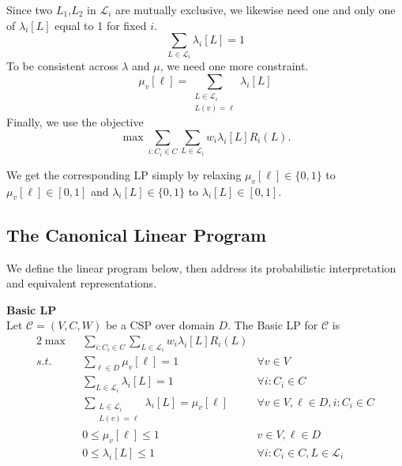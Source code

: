 Since two $L_1$,$L_2$ in $ \mathcal{L}_i$ are mutually exclusive, we likewise need one and only one of $\lambda_i[L]$ equal to 1 for fixed $i$.
\begin{equation*}
\sum_{L \in \mathcal{L}_i} \lambda_i[L] = 1 
\end{equation*}
To be consistent across $\lambda$ and $\mu$, we need one more constraint.
\begin{equation*}
\mu_v[\ell] = \sum_{\substack{ L \in \mathcal{L}_i \\ L(v) = \ell }} \lambda_i[L] 
\end{equation*}
Finally, we use the objective
\begin{equation*}
\max \sum_{i : C_i \in C} \sum_{L \in \mathcal{L}_i}   w_i\lambda_i[L] R_i(L).
\end{equation*}

We get the corresponding LP simply by relaxing $\mu_v[\ell] \in \{0,1\}$ to $\mu_v[\ell] \in [0,1]$ and $\lambda_i[L] \in \{0,1\}$ to $\lambda_i[L] \in [0,1]$.
\subsection{The Canonical Linear Program}

We define the linear program below, then address its probabilistic interpretation and equivalent representations.
\begin{definition}\textbf{Basic LP} \\
Let $\mathcal{C} = (V,C,W)$ be a CSP over domain $D$. The Basic LP for $\mathcal{C}$ is
\begin{alignat}{2}
\max ~&~ \sum_{i : C_i \in C} \sum_{L \in \mathcal{L}_i}   w_i\lambda_i[L] R_i(L) & \\
s.t. ~ & ~ \sum_{\ell \in D} \mu_v[\ell] = 1 & \forall v \in V  \label{eq:canonLPmuSum} \\
     ~ & ~ \sum_{L \in \mathcal{L}_i} \lambda_i[L] = 1  & \forall i : C_i \in C \label{eq:canonLPlambdaSum} \\
     ~ & ~ \sum_{\substack{ L \in \mathcal{L}_i \\ L(v) = \ell }} \lambda_i[L] = \mu_v[\ell]  & \forall v \in V, \ell \in D, i : C_i \in C \label{eq:canonLPConsistency} \\
     ~ & ~ 0 \leq \mu_v[\ell] \leq 1 & v \in V, \ell \in D \label{eq:canonLPmuNonNeg}\\
     ~ & ~ 0 \leq \lambda_i[L] \leq 1  & \forall  i : C_i \in C, L \in \mathcal{L}_i  \label{eq:canonLPlambdaNonNeg} 
\end{alignat}
\end{definition}

